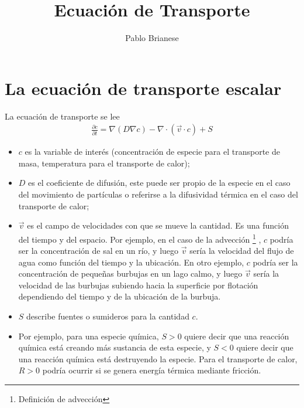 \documentclass{article}
\title{Ecuación de Transporte}
\author{Pablo Brianese}
\begin{document}
  \maketitle
  \section{La ecuación de transporte escalar}
  La ecuación de transporte se lee
  \begin{align}
    \frac{\partial c}{\partial t} = \nabla (D \nabla c) - \nabla \cdot (\vec{v} \cdot c) + S
  \end{align}
  \begin{itemize}
    \item \(c\) es la variable de interés (concentración de especie para el transporte de masa, temperatura para el transporte de calor);
    \item \(D\) es el coeficiente de difusión, este puede ser propio de la especie en el caso del movimiento de partículas o referirse a la difusividad térmica en el caso del transporte de calor;
    \item \(\vec{v}\) es el campo de velocidades con que se mueve la cantidad.
    Es una función del tiempo y del espacio.
    Por ejemplo, en el caso de la advección
    \footnote{Definición de advección}
    ,
    \(c\) podría ser la concentración de sal en un río, y luego \(\vec{v}\) sería la velocidad del flujo de agua como función del tiempo y la ubicación.
    En otro ejemplo, \(c\) podría ser la concentración de pequeñas burbujas en un lago calmo, y luego \(\vec{v}\) sería la velocidad de las burbujas subiendo hacia la superficie por flotación dependiendo del tiempo y de la ubicación de la burbuja.
    \item \(S\) describe fuentes o sumideros para la cantidad \(c\).
    \item Por ejemplo, para una especie química, \(S > 0\) quiere decir que una reacción química está creando más sustancia de esta especie, y \(S < 0\) quiere decir que una reacción química está destruyendo la especie.
    Para el transporte de calor, \(R > 0\) podría ocurrir si se genera energía térmica mediante fricción.
  \end{itemize}
  
\end{document}
